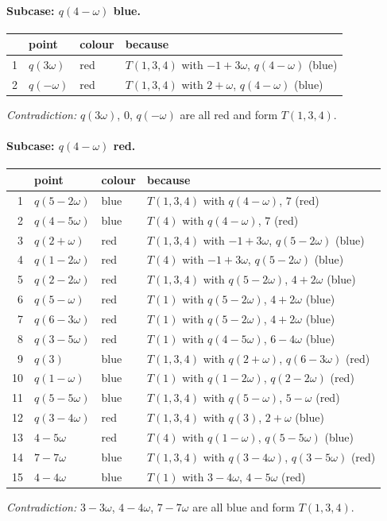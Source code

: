 \paragraph{Subcase: $q(4-\omega)$ blue.}
\begin{center}\small\begin{longtable}{rlll}\toprule & point & colour & because\\\midrule\endhead
1 & $q(3\omega)$ & red & $T(1,3,4)$ with $-1+3\omega$, $q(4-\omega)$ (blue)\\
2 & $q(-\omega)$ & red & $T(1,3,4)$ with $2+\omega$, $q(4-\omega)$ (blue)\\
\bottomrule\end{longtable}\end{center}
\noindent\emph{Contradiction:} $q(3\omega)$, $0$, $q(-\omega)$ are all red and form $T(1,3,4)$.\par\medskip
\paragraph{Subcase: $q(4-\omega)$ red.}
\begin{center}\small\begin{longtable}{rlll}\toprule & point & colour & because\\\midrule\endhead
1 & $q(5-2\omega)$ & blue & $T(1,3,4)$ with $q(4-\omega)$, $7$ (red)\\
2 & $q(4-5\omega)$ & blue & $T(4)$ with $q(4-\omega)$, $7$ (red)\\
3 & $q(2+\omega)$ & red & $T(1,3,4)$ with $-1+3\omega$, $q(5-2\omega)$ (blue)\\
4 & $q(1-2\omega)$ & red & $T(4)$ with $-1+3\omega$, $q(5-2\omega)$ (blue)\\
5 & $q(2-2\omega)$ & red & $T(1,3,4)$ with $q(5-2\omega)$, $4+2\omega$ (blue)\\
6 & $q(5-\omega)$ & red & $T(1)$ with $q(5-2\omega)$, $4+2\omega$ (blue)\\
7 & $q(6-3\omega)$ & red & $T(1)$ with $q(5-2\omega)$, $4+2\omega$ (blue)\\
8 & $q(3-5\omega)$ & red & $T(1)$ with $q(4-5\omega)$, $6-4\omega$ (blue)\\
9 & $q(3)$ & blue & $T(1,3,4)$ with $q(2+\omega)$, $q(6-3\omega)$ (red)\\
10 & $q(1-\omega)$ & blue & $T(1)$ with $q(1-2\omega)$, $q(2-2\omega)$ (red)\\
11 & $q(5-5\omega)$ & blue & $T(1,3,4)$ with $q(5-\omega)$, $5-\omega$ (red)\\
12 & $q(3-4\omega)$ & red & $T(1,3,4)$ with $q(3)$, $2+\omega$ (blue)\\
13 & $4-5\omega$ & red & $T(4)$ with $q(1-\omega)$, $q(5-5\omega)$ (blue)\\
14 & $7-7\omega$ & blue & $T(1,3,4)$ with $q(3-4\omega)$, $q(3-5\omega)$ (red)\\
15 & $4-4\omega$ & blue & $T(1)$ with $3-4\omega$, $4-5\omega$ (red)\\
\bottomrule\end{longtable}\end{center}
\noindent\emph{Contradiction:} $3-3\omega$, $4-4\omega$, $7-7\omega$ are all blue and form $T(1,3,4)$.\par\medskip
